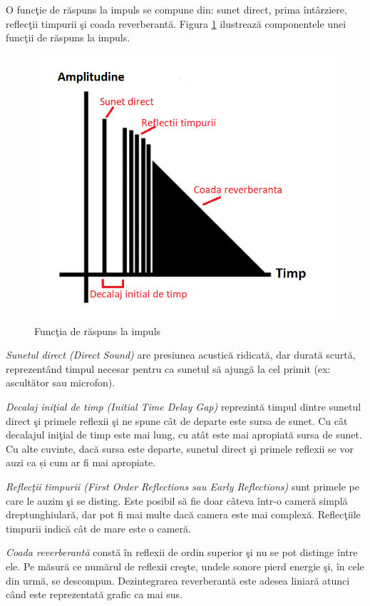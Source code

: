 	O func\c{t}ie de r\u{a}spuns la impuls se compune din: sunet direct, prima \^{i}nt\^{a}rziere, reflec\c{t}ii timpurii \c{s}i coada reverberant\u{a}. Figura \ref{Fig4} ilustreaz\u{a} componentele unei func\c{t}ii de r\u{a}spuns la impuls.
	
	\begin{figure}[!htb]
		\centering
		\includegraphics[width=0.7\linewidth]{imagini/impulseResponse.png}
		\caption{Func\c{t}ia de r\u{a}spuns la impuls}
		\label{Fig4}
	\end{figure}

	{\it{Sunetul direct (Direct Sound)}} are presiunea acustic\u{a} ridicat\u{a}, dar durat\u{a} scurt\u{a}, reprezent\^{a}nd timpul necesar pentru ca sunetul s\u{a} ajung\u{a} la cel primit (ex: ascult\u{a}tor sau microfon).
	 
	
	{\it{Decalaj ini\c{t}ial de timp (Initial Time Delay Gap)}}	reprezint\u{a} timpul dintre sunetul direct \c{s}i primele reflexii \c{s}i ne spune c\^{a}t de departe este sursa de sunet. Cu c\^{a}t decalajul ini\c{t}ial de timp este mai lung, cu at\^{a}t este mai apropiat\u{a} sursa de sunet. Cu alte cuvinte, dac\u{a} sursa este departe, sunetul direct \c{s}i primele reflexii se vor auzi ca și cum ar fi mai apropiate.
	 
	
	{\it{Reflec\c{t}ii timpurii (First Order Reflections sau Early Reflections)}} sunt primele pe care le auzim \c{s}i se disting. Este posibil s\u{a} fie doar c\^{a}teva \^{i}ntr-o camer\u{a} simpl\u{a} dreptunghiular\u{a}, dar pot fi mai multe dac\u{a} camera este mai complex\u{a}. Reflec\c{t}iile timpurii indic\u{a} c\^{a}t de mare este o camer\u{a}.
	 
	
	{\it{Coada reverberant\u{a}}} const\u{a} \^{i}n reflexii de ordin superior \c{s}i nu se pot distinge \^{i}ntre ele. Pe m\u{a}sur\u{a} ce num\u{a}rul de reflexii cre\c{s}te, undele sonore pierd energie \c{s}i, \^{i}n cele din urm\u{a}, se descompun. Dezintegrarea reverberant\u{a} este adesea liniar\u{a} atunci c\^{a}nd este reprezentat\u{a} grafic ca mai sus. 
	
